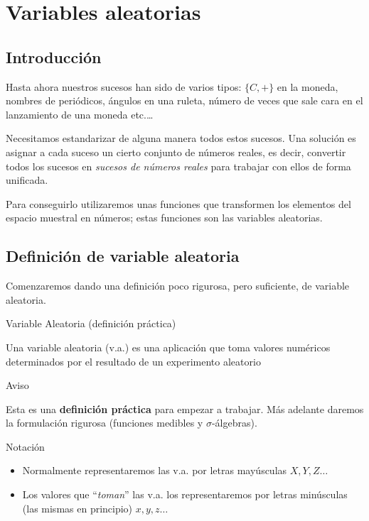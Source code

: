\documentclass[
  letterpaper,
  DIV=11,
  numbers=noendperiod]{scrreprt}
\providecommand{\tightlist}{%
  \setlength{\itemsep}{0pt}\setlength{\parskip}{0pt}}\usepackage{longtable,booktabs,array}
\begin{document}
\chapter{Variables aleatorias}\label{variables-aleatorias}

\section{Introducción}\label{introducciuxf3n}

Hasta ahora nuestros sucesos han sido de varios tipos: \(\{C,+\}\) en la
moneda, nombres de periódicos, ángulos en una ruleta, número de veces
que sale cara en el lanzamiento de una moneda etc.\ldots

Necesitamos estandarizar de alguna manera todos estos sucesos. Una
solución es asignar a cada suceso un cierto conjunto de números reales,
es decir, convertir todos los sucesos en \emph{sucesos de números
reales} para trabajar con ellos de forma unificada.

Para conseguirlo utilizaremos unas funciones que transformen los
elementos del espacio muestral en números; estas funciones son las
variables aleatorias.

\section{Definición de variable
aleatoria}\label{definiciuxf3n-de-variable-aleatoria}

Comenzaremos dando una definición poco rigurosa, pero suficiente, de
variable aleatoria.

\begin{Definicion}{Variable Aleatoria (definición práctica)}{}

Una variable aleatoria (v.a.) es una aplicación que toma valores
numéricos determinados por el resultado de un experimento aleatorio

\end{Definicion}

\begin{Advertencia}{Aviso}{}

Esta es una \textbf{definición práctica} para empezar a trabajar. Más
adelante daremos la formulación rigurosa (funciones medibles y
\(\sigma\)-álgebras).

\end{Advertencia}

\begin{Nota}{Notación}{}

\begin{itemize}
\tightlist
\item
  Normalmente representaremos las v.a. por letras mayúsculas
  \(X,Y,Z\ldots\)
\item
  Los valores que ``\emph{toman}'' las v.a. los representaremos por
  letras minúsculas (las mismas en principio) \(x,y,z\ldots\)
\end{itemize}

\end{Nota}
\end{document}
